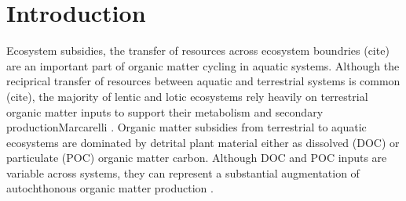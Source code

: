 \section{Introduction}
Ecosystem subsidies, the transfer of resources across ecosystem boundries (cite) are an important part of organic matter cycling in aquatic systems. Although the reciprical transfer of resources between aquatic and terrestrial systems is common (cite), the majority of lentic and lotic ecosystems rely heavily on terrestrial organic matter inputs to support their metabolism and secondary productionMarcarelli \cite{Marcarelli_2011}. Organic matter subsidies from terrestrial to aquatic ecosystems are dominated by detrital plant material either as dissolved (DOC) or particulate (POC) organic matter carbon. Although DOC and POC inputs are variable across systems, they can represent a substantial augmentation of autochthonous organic matter production \cite{Hodkinson_1975} \cite{GASITH_1976} \cite{wetzel_1984} \cite{WETZEL_1995} \cite{Webster_1997} \cite{kobyashietal2011} \cite{Mehring_2014}.    



